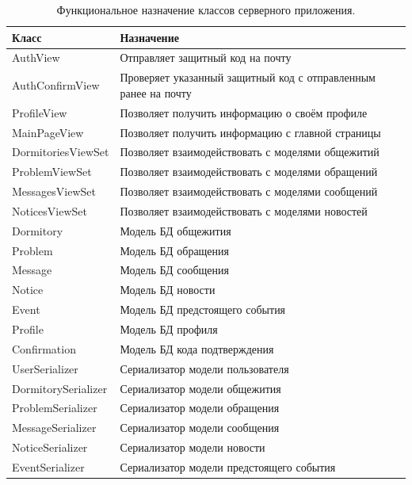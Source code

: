 \documentclass{../includes/TechDoc}
\begin{document}
    \begin{table}[ht]
        \caption{\label{tab:classes-table-server}Функциональное назначение классов серверного приложения.}
        \centering
        \begin{tabular}{ | p{4.5cm} | p{12.5cm} | }
            \hline
            \textbf{Класс} & \textbf{Назначение}  \\ \hline
            AuthView & Отправляет защитный код на почту \\ \hline
            AuthConfirmView & Проверяет указанный защитный код с отправленным ранее на почту \\ \hline
            ProfileView & Позволяет получить информацию о своём профиле \\ \hline
            MainPageView & Позволяет получить информацию с главной страницы \\ \hline
            DormitoriesViewSet & Позволяет взаимодействовать с моделями общежитий \\ \hline
            ProblemViewSet & Позволяет взаимодействовать с моделями обращений \\ \hline
            MessagesViewSet & Позволяет взаимодействовать с моделями сообщений \\ \hline
            NoticesViewSet & Позволяет взаимодействовать с моделями новостей \\ \hline
            Dormitory & Модель БД общежития \\ \hline
            Problem & Модель БД обращения \\ \hline
            Message & Модель БД сообщения \\ \hline
            Notice & Модель БД новости \\ \hline
            Event & Модель БД предстоящего события \\ \hline
            Profile & Модель БД профиля \\ \hline
            Confirmation & Модель БД кода подтверждения \\ \hline
            UserSerializer & Сериализатор модели пользователя \\ \hline
            DormitorySerializer & Сериализатор модели общежития \\ \hline
            ProblemSerializer & Сериализатор модели обращения \\ \hline
            MessageSerializer & Сериализатор модели сообщения \\ \hline
            NoticeSerializer & Сериализатор модели новости \\ \hline
            EventSerializer & Сериализатор модели предстоящего события \\ \hline
        \end{tabular}
    \end{table}
\end{document}
